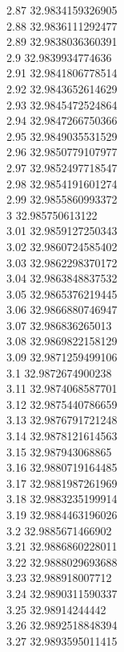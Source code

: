 {2.87	32.9834159326905\\
2.88	32.9836111292477\\
2.89	32.9838036360391\\
2.9	32.9839934774636\\
2.91	32.9841806778514\\
2.92	32.9843652614629\\
2.93	32.9845472524864\\
2.94	32.9847266750366\\
2.95	32.9849035531529\\
2.96	32.9850779107977\\
2.97	32.9852497718547\\
2.98	32.9854191601274\\
2.99	32.9855860993372\\
3	32.985750613122\\
3.01	32.9859127250343\\
3.02	32.9860724585402\\
3.03	32.9862298370172\\
3.04	32.9863848837532\\
3.05	32.9865376219445\\
3.06	32.9866880746947\\
3.07	32.986836265013\\
3.08	32.9869822158129\\
3.09	32.9871259499106\\
3.1	32.9872674900238\\
3.11	32.9874068587701\\
3.12	32.9875440786659\\
3.13	32.9876791721248\\
3.14	32.9878121614563\\
3.15	32.987943068865\\
3.16	32.9880719164485\\
3.17	32.9881987261969\\
3.18	32.9883235199914\\
3.19	32.9884463196026\\
3.2	32.9885671466902\\
3.21	32.9886860228011\\
3.22	32.9888029693688\\
3.23	32.988918007712\\
3.24	32.9890311590337\\
3.25	32.98914244442\\
3.26	32.9892518848394\\
3.27	32.9893595011415\\
}
